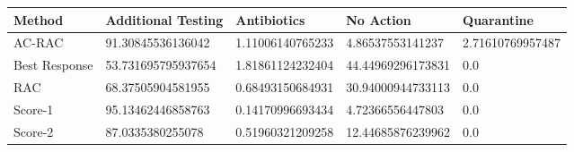 \begin{tabular}{lllll}
\toprule
Method & Additional Testing & Antibiotics & No Action & Quarantine \\
\midrule
AC-RAC & 91.30845536136042 & 1.11006140765233 & 4.86537553141237 & 2.71610769957487 \\
Best Response & 53.731695795937654 & 1.81861124232404 & 44.44969296173831 & 0.0 \\
RAC & 68.37505904581955 & 0.68493150684931 & 30.94000944733113 & 0.0 \\
Score-1 & 95.13462446858763 & 0.14170996693434 & 4.72366556447803 & 0.0 \\
Score-2 & 87.0335380255078 & 0.51960321209258 & 12.44685876239962 & 0.0 \\
\bottomrule
\end{tabular}
